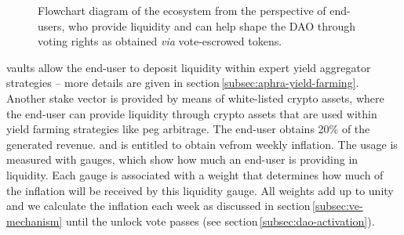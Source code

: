 \begin{figure}[p]
    \vspace*{-2cm}
    \caption{Flowchart diagram of the \aphra ecosystem from the perspective of end-users, who provide liquidity and can help shape the DAO through voting rights as obtained \textit{via} vote-escrowed \aphra tokens.}
    \label{fig:ae-flow}
\end{figure}

\aphra vaults allow the end-user to deposit liquidity within expert yield aggregator strategies -- more details are given in section\,\ref{subsec:aphra-yield-farming}.
Another stake vector is provided by means of white-listed crypto assets, where the end-user can provide liquidity through crypto assets that are used within yield farming strategies like peg arbitrage.
The end-user obtains 20\% of the generated revenue. and is entitled to obtain ve\aphra from weekly inflation.
The usage is measured with gauges, which show how much an end-user is providing in liquidity.
Each gauge is associated with a weight that determines how much of the inflation will be received by this liquidity gauge.
All weights add up to unity and we calculate the inflation each week as discussed in section\,\ref{subsec:ve-mechanism} until the unlock vote passes (see section\,\ref{subsec:dao-activation}).\\[-1em]

